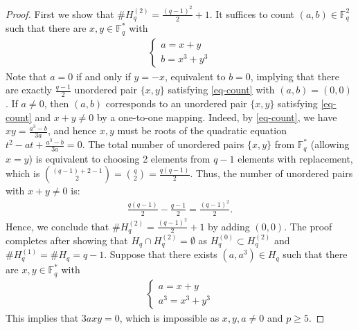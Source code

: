 \documentclass[10pt,a4paper]{amsart}
\newcommand{\F}{\mathbb{F}}
\begin{document}
\begin{proof}
First we show that $\#H_q^{(2)}=\frac{(q-1)^2}{2}+1$.
It suffices to count $(a, b)\in \F_q^2$ such that there are $x, y\in \F_q^*$ with
\begin{align}
\label{eq-count}
  \begin{cases}
    a=x+y  \\
    b=x^3+y^3
  \end{cases}
\end{align}
Note that $a=0$ if and only if $y=-x$, equivalent to $b=0$, implying that there are exactly $\frac{q-1}{2}$ unordered pair $\{x, y\}$ satisfying \eqref{eq-count} with $(a, b)=(0, 0)$. 
If $a\neq 0$, then $(a, b)$ corresponds to an unordered pair $\{x, y\}$ satisfying \eqref{eq-count} and $x+y\neq 0$ by a one-to-one mapping. 
Indeed, by \eqref{eq-count}, we have $xy=\frac{a^3-b}{3a}$, and hence $x, y$ must be roots of the quadratic equation $t^2-at+\frac{a^3-b}{3a}=0$. 
The total number of unordered pairs $\{x,y\}$ from $\mathbb{F}_q^*$ (allowing $x=y$) is equivalent to choosing 2 elements from $q-1$ elements with replacement, which is $\binom{(q-1)+2-1}{2} = \binom{q}{2} = \frac{q(q-1)}{2}$.
Thus, the number of unordered pairs with $x+y \neq 0$ is:
\begin{align*}
    \frac{q(q-1)}{2} - \frac{q-1}{2} = \frac{(q-1)^2}{2}.
\end{align*}
Hence, we conclude that $\#H_q^{(2)} = \frac{(q-1)^2}{2}+1$ by adding $(0,0)$.
The proof completes after showing that $H_q \cap H_q^{(2)}=\emptyset$ as $H_q^{(0)} \subset H_q^{(2)}$ and $\#H_q^{(1)}=\#H_q=q-1$.
Suppose that there exists $(a, a^3) \in H_q$ such that there are $x, y \in \F_q^*$ with 
\begin{align*}
  \begin{cases}
    a=x+y  \\
    a^3=x^3+y^3
  \end{cases}
\end{align*}
This implies that $3axy=0$, which is impossible as $x, y, a \neq 0$ and $p\geq 5$.
\end{proof}
\end{document}
